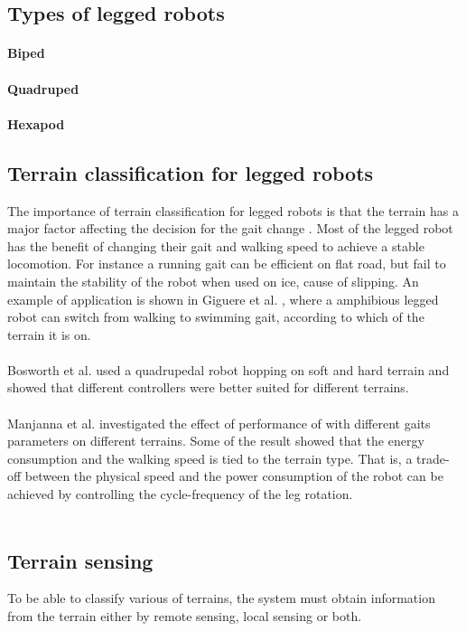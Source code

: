 \documentclass[USenglish]{ifimaster}  %
\begin{document}
\subsection{Types of legged robots}


\paragraph{Biped}

\paragraph{Quadruped}

\paragraph{Hexapod}


\subsection{Terrain classification for legged robots}
The importance of terrain classification for legged robots is that the terrain has a major factor affecting the decision for the gait change \cite{6569179}. Most of the legged robot has the benefit of changing their gait and walking speed to achieve a stable locomotion. For instance a running gait can be efficient on flat road, but fail to maintain the stability of the robot when used on ice, cause of slipping. An example of application is shown in Giguere et al. \cite{Giguere06environmentidentification}, where a amphibious legged robot can switch from walking to swimming gait, according to which of the terrain it is on. 
\\
\\
Bosworth et al. \cite{7487541} used a quadrupedal robot hopping on soft and hard terrain and showed that different controllers were better suited for different terrains. 
\\
\\
Manjanna et al. \cite{6569179} investigated the effect of performance of with different gaits parameters on different terrains. Some of the result showed that the energy consumption and the walking speed is tied to the terrain type. That is, a trade-off between the physical speed and the power consumption of the robot can be achieved by controlling the cycle-frequency of the leg rotation.
\\
\\
\subsection{Terrain sensing}
To be able to classify various of terrains, the system must obtain information from the terrain either by remote sensing, local sensing or both.
\end{document}
